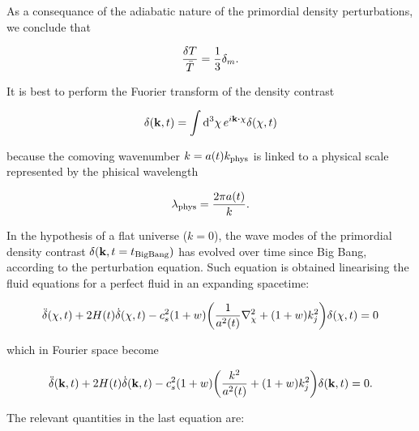 As a consequance of the adiabatic nature of the primordial density
perturbations, we conclude that

\begin{equation}
        \frac{\var{T}}{\bar T} = \frac{1}{3} \delta_m. 
\end{equation}

It is best to perform the Fuorier transform of the density contrast

\begin{equation}
        \delta \qty(\vb{k},t) = \int \dd[3]{\vb{\chi}} e^{i\vb{k} \vdot
        \vb{\chi}} \delta\qty(\vb{\chi},t)
\end{equation}

because the comoving wavenumber $k = a\qty(t) k_\text{phys}$ is linked to a
physical scale represented by the phisical wavelength

\begin{equation}
        \lambda_\text{phys} = \frac{2\pi a\qty(t)}{k}.
\end{equation}

In the hypothesis  of a flat universe ($k = 0$), the wave modes of the
primordial density contrast $\delta\qty(\vb{k},t = t_\text{BigBang})$
has evolved over time since Big Bang, according to the perturbation
equation. Such equation is obtained linearising the fluid equations
for a perfect fluid in an expanding spacetime:

\begin{equation}
        \ddot \delta\qty(\vb{\chi},t) + 2H\qty(t)\dot \delta\qty(\vb{\chi},t) -
        c_s^2\qty(1 + w)\qty(\frac{1}{a^2\qty(t)} \laplacian_\chi + \qty(
        1 + w)k^2_j)
        \delta\qty(\vb{\chi},t) = 0
\end{equation}

which in Fourier space become

\begin{equation}
        \ddot \delta\qty(\vb{k},t) + 2H\qty(t)\dot \delta\qty(\vb{k},t) -
        c_s^2\qty(1 + w)\qty(\frac{k^2}{a^2\qty(t)} + \qty(1 + w)k^2_j)
        \delta\qty(\vb{k},t) = 0.
        \label{eq:perturbations_density}
\end{equation}

The relevant quantities in the last equation are:

